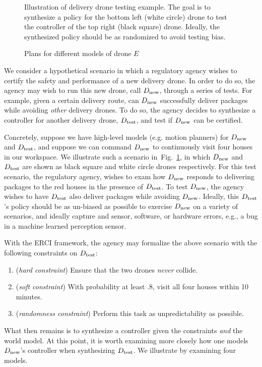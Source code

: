 
\begin{figure}
  \centering {}
  \caption{ Illustration of delivery drone testing example. The goal
    is to synthesize a policy for the bottom left (white circle) drone
    to test the controller of the top right (black square) drone. Ideally,
    the synthesized policy should be as randomized to avoid testing bias.\label{fig:motivating} }
\end{figure}

\begin{figure*}

\caption{Plans for different models of drone $E$}	
\end{figure*}

We consider a hypothetical scenario in which a regulatory agency
wishes to certify the safety and performance of a new delivery drone.
In order to do so, the agency may wish to run this new drone, call
${D_{\text{new}}}$, through a series of tests. For example, given a certain
delivery route, can ${D_{\text{new}}}$ successfully deliver packages while
avoiding \emph{other} delivery drones. To do so, the agency decides to
synthesize a controller for another delivery drone, ${D_{\text{test}}}$, and test if
${D_{\text{new}}}$ can be certified.

Concretely, suppose we have high-level models (e.g. motion planners)
for ${D_{\text{new}}}$ and ${D_{\text{test}}}$, and suppose we can command
${D_{\text{new}}}$ to continuously visit four houses in our workspace. We
illustrate such a scenario in~Fig.~\ref{fig:motivating}, in which
${D_{\text{new}}}$ and ${D_{\text{test}}}$ are shown as black square and white circle
drones respectively.  For this test scenario, the regulatory agency,
wishes to exam how ${D_{\text{new}}}$ responds to delivering packages to the
red houses in the presence of ${D_{\text{test}}}$. To test ${D_{\text{new}}}$, the
agency wishes to have ${D_{\text{test}}}$ also deliver packages while avoiding
${D_{\text{new}}}$.  Ideally, this ${D_{\text{test}}}$'s policy should be as
un-biased as possible to exercise ${D_{\text{new}}}$ on a variety of
scenarios, and ideally capture and sensor, software, or hardware
errors, e.g., a bug in a machine learned perception sensor.

With the ERCI framework, the agency may formalize the above scenario with the
following constraints on ${D_{\text{test}}}$:
\begin{enumerate}
\item (\emph{hard constraint}) Ensure that the two drones \emph{never} collide.
\item (\emph{soft constraint}) With probability at least $.8$, visit all four houses within 10 minutes.
\item (\emph{randomness constraint}) Perform this task as unpredictability as possible.
\end{enumerate}
What then remains is to synthesize a controller given the constraints
\emph{and} the world model. At this point, it is worth examining more
closely how one models ${D_{\text{new}}}$'s controller when synthesizing
${D_{\text{test}}}$. We illustrate by examining four models.

